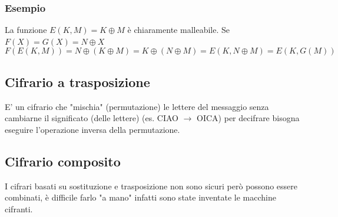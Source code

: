 \documentclass[12pt, a4paper]{report}
\begin{document}
\subsubsection{Esempio}
La funzione $E(K,M)=K\oplus M$ è chiaramente malleabile. Se $F(X)=G(X)=N\oplus X$
\begin{equation*}
    F(E(K,M)) = N\oplus (K\oplus M) = K \oplus (N\oplus M) = E(K,N\oplus M) = E(K,G(M))
\end{equation*}
\subsection{Cifrario a trasposizione}
E' un cifrario che "mischia" (permutazione) le lettere del messaggio senza cambiarne il significato (delle lettere) (es. CIAO $\rightarrow$ OICA) per decifrare bisogna eseguire l'operazione inversa della permutazione.
\subsection{Cifrario composito}
I cifrari basati su sostituzione e trasposizione non sono sicuri però possono essere combinati, è difficile farlo "a mano" infatti sono state inventate le macchine cifranti.
\end{document}
